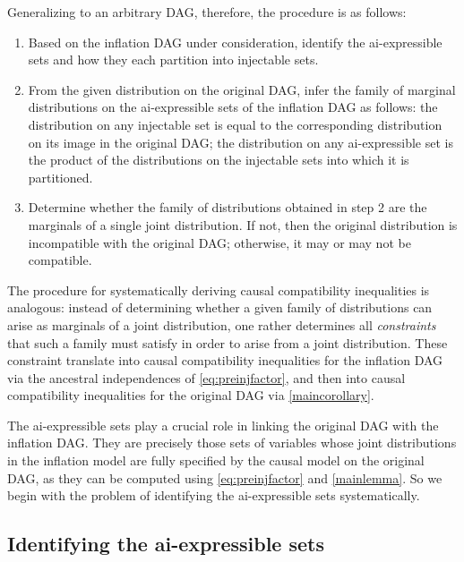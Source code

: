 \documentclass[aps,english,10pt,superscriptaddress,onecolumn,twoside,longbibliography,pra,floatfix,fleqn,nofootinbib]{revtex4-1}%
\theoremstyle{definition}
\begin{document}
Generalizing to an arbitrary DAG, therefore, the procedure is as follows:
\begin{enumerate}
\item Based on the inflation DAG under consideration, identify the ai-expressible sets and how they each partition into injectable sets.
\item From the given distribution on the original DAG, infer the family of marginal distributions on the ai-expressible sets of the inflation DAG as follows: the distribution on any injectable set is equal to the corresponding distribution on its image in the original DAG; the distribution on any ai-expressible set is the product of the distributions on the injectable sets into which it is partitioned.
\item Determine whether the family of distributions obtained in step 2 are the marginals of a single joint distribution. If not, then the original distribution is incompatible with the original DAG; otherwise, it may or may not be compatible.
\end{enumerate}

The procedure for systematically deriving causal compatibility inequalities is analogous: instead of determining whether a given family of distributions can arise as marginals of a joint distribution, one rather determines all \emph{constraints} that such a family must satisfy in order to arise from a joint distribution. These constraint translate into causal compatibility inequalities for the inflation DAG via the ancestral independences of \cref{eq:preinjfactor}, and then into causal compatibility inequalities for the original DAG via \cref{maincorollary}.

The ai-expressible sets play a crucial role in linking the original DAG with the inflation DAG.  They are precisely those sets of variables whose joint distributions in the inflation model are fully specified by the causal model on the original DAG, as they can be computed using \cref{eq:preinjfactor} and \cref{mainlemma}. So we begin with the problem of identifying the ai-expressible sets systematically.

\subsection{Identifying the ai-expressible sets}
\label{step:findpreinjectable}
\end{document}
